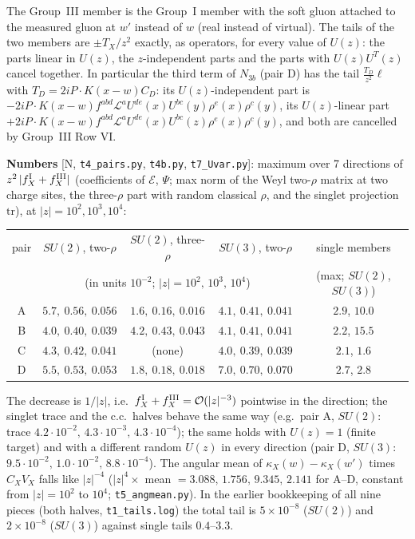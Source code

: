 \documentclass[10pt]{article}
\begin{document}
The Group~III member is the Group~I member with the soft gluon attached to the measured gluon at $w'$ instead of $w$ (real instead of virtual). The tails of the two members are $\pm T_{X}/z^{2}$ exactly, as operators, for every value of $U(z)$: the parts linear in $U(z)$, the $z$-independent parts and the parts with $U(z)U^{T}(z)$ cancel together. In particular the third term of $N_{3b}$ (pair D) has the tail $\frac{T_{D}}{z^{2}}\ell$ with $T_{D}=2iP\cdot K(x-w)C_{D}$: its $U(z)$-independent part is $-2iP\!\cdot\!K(x-w)f^{abd}\mathcal{L}^{a}U^{de}(x)U^{bc}(y)\rho^{e}(x)\rho^{c}(y)$, its $U(z)$-linear part $+2iP\!\cdot\!K(x-w)f^{abd}\mathcal{L}^{a}U^{de}(x)U^{bc}(z)\rho^{e}(x)\rho^{c}(y)$, and both are cancelled by Group~III Row VI.

\noindent\textbf{Numbers} [N, \texttt{t4\_pairs.py}, \texttt{t4b.py}, \texttt{t7\_Uvar.py}]: maximum over 7 directions of $z^{2}\,|f^{\rm I}_{X}+f^{\rm III}_{X}|$ (coefficients of $\mathcal{E}$, $\Psi$; max norm of the Weyl two-$\rho$ matrix at two charge sites, the three-$\rho$ part with random classical $\rho$, and the singlet projection $\mathrm{tr}$), at $|z|=10^{2},10^{3},10^{4}$:
\begin{center}
\renewcommand{\arraystretch}{1.25}\small
\begin{tabular}{|c|c|c|c|c|}\hline
pair & $SU(2)$, two-$\rho$ & $SU(2)$, three-$\rho$ & $SU(3)$, two-$\rho$ & single members\\
 & \multicolumn{3}{c|}{(in units $10^{-2}$; $|z|=10^{2},\,10^{3},\,10^{4}$)} & (max; $SU(2)$, $SU(3)$)\\\hline
A & $5.7,\ 0.56,\ 0.056$ & $1.6,\ 0.16,\ 0.016$ & $4.1,\ 0.41,\ 0.041$ & $2.9$, $10.0$\\
B & $4.0,\ 0.40,\ 0.039$ & $4.2,\ 0.43,\ 0.043$ & $4.1,\ 0.41,\ 0.041$ & $2.2$, $15.5$\\
C & $4.3,\ 0.42,\ 0.041$ & (none) & $4.0,\ 0.39,\ 0.039$ & $2.1$, $1.6$\\
D & $5.5,\ 0.53,\ 0.053$ & $1.8,\ 0.18,\ 0.018$ & $7.0,\ 0.70,\ 0.070$ & $2.7$, $2.8$\\\hline
\end{tabular}
\end{center}
The decrease is $1/|z|$, i.e.\ $f^{\rm I}_{X}+f^{\rm III}_{X}={\cal O}(|z|^{-3})$ pointwise in the direction; the singlet trace and the c.c.\ halves behave the same way (e.g.\ pair A, $SU(2)$: trace $4.2\cdot10^{-2},\,4.3\cdot10^{-3},\,4.3\cdot10^{-4}$); the same holds with $U(z)=1$ (finite target) and with a different random $U(z)$ in every direction (pair D, $SU(3)$: $9.5\cdot10^{-2},\,1.0\cdot10^{-2},\,8.8\cdot10^{-4}$). The angular mean of $\kappa_{X}(w)-\kappa_{X}(w')$ times $C_{X}V_{X}$ falls like $|z|^{-4}$ ($|z|^{4}\times$ mean $=3.088,\,1.756,\,9.345,\,2.141$ for A--D, constant from $|z|=10^{2}$ to $10^{4}$; \texttt{t5\_angmean.py}). In the earlier bookkeeping of all nine pieces (both halves, \texttt{t1\_tails.log}) the total tail is $5\times10^{-8}$ ($SU(2)$) and $2\times10^{-8}$ ($SU(3)$) against single tails $0.4$--$3.3$.
\end{document}
